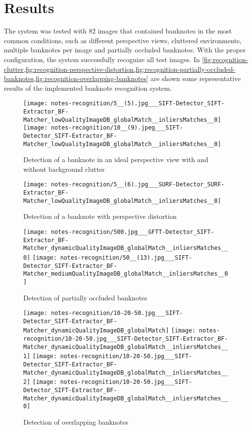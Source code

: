 \section{Results}\label{sec:results}

The system was tested with 82 images that contained banknotes in the most common conditions, such as different perspective views, cluttered environments, multiple banknotes per image and partially occluded banknotes. With the proper configuration, the system successfully recognize all test images. In \cref{fig:recognition-clutter,fig:recognition-perspective-distortion,fig:recognition-partially-occluded-banknotes,fig:recognition-overlapping-banknotes} are shown some representative results of the implemented banknote recognition system.

\begin{figure}[H]
	\centering
	\texttt{[image: notes-recognition/5\_\_(5).jpg\_\_\_SIFT-Detector\_SIFT-Extractor\_BF-Matcher\_lowQualityImageDB\_globalMatch\_\_inliersMatches\_\_0]}\hfill
	\texttt{[image: notes-recognition/10\_\_(9).jpeg\_\_\_SIFT-Detector\_SIFT-Extractor\_BF-Matcher\_lowQualityImageDB\_globalMatch\_\_inliersMatches\_\_0]}
	\caption{Detection of a banknote in an ideal perspective view with and without background clutter}
	\label{fig:recognition-clutter}
\end{figure}

\begin{figure}[H]
	\centering
	\texttt{[image: notes-recognition/5\_\_(6).jpg\_\_\_SURF-Detector\_SURF-Extractor\_BF-Matcher\_lowQualityImageDB\_globalMatch\_\_inliersMatches\_\_0]}
	\caption{Detection of a banknote with perspective distortion}
	\label{fig:recognition-perspective-distortion}
\end{figure}

\begin{figure}[H]
	\centering
	\texttt{[image: notes-recognition/500.jpg\_\_\_GFTT-Detector\_SIFT-Extractor\_BF-Matcher\_dynamicQualityImageDB\_globalMatch\_\_inliersMatches\_\_0]}\hfill
	\texttt{[image: notes-recognition/50\_\_(13).jpg\_\_\_SIFT-Detector\_SIFT-Extractor\_BF-Matcher\_mediumQualityImageDB\_globalMatch\_\_inliersMatches\_\_0]}
	\caption{Detection of partially occluded banknotes}
	\label{fig:recognition-partially-occluded-banknotes}
\end{figure}

\begin{figure}[H]
	\centering
	\texttt{[image: notes-recognition/10-20-50.jpg\_\_\_SIFT-Detector\_SIFT-Extractor\_BF-Matcher\_dynamicQualityImageDB\_globalMatch]}\hfill
	\texttt{[image: notes-recognition/10-20-50.jpg\_\_\_SIFT-Detector\_SIFT-Extractor\_BF-Matcher\_dynamicQualityImageDB\_globalMatch\_\_inliersMatches\_\_1]}\hfill
	\texttt{[image: notes-recognition/10-20-50.jpg\_\_\_SIFT-Detector\_SIFT-Extractor\_BF-Matcher\_dynamicQualityImageDB\_globalMatch\_\_inliersMatches\_\_2]}\hfill
	\texttt{[image: notes-recognition/10-20-50.jpg\_\_\_SIFT-Detector\_SIFT-Extractor\_BF-Matcher\_dynamicQualityImageDB\_globalMatch\_\_inliersMatches\_\_0]}
	\caption{Detection of overlapping banknotes}
	\label{fig:recognition-overlapping-banknotes}
\end{figure}
